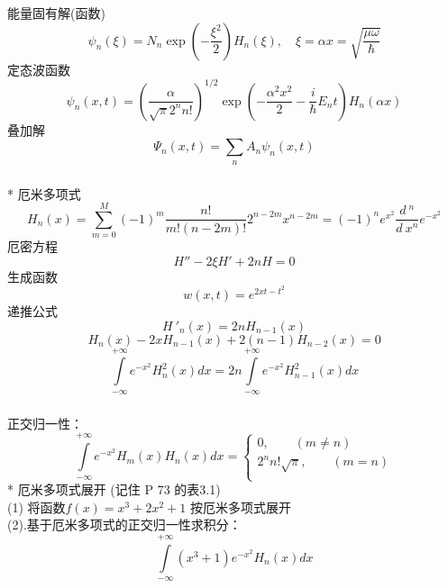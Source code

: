 \begin{frame}
      \frametitle{}
    能量固有解(函数)
	\begin{equation*}
		\psi_n(\xi) = N_n \exp(-\frac{\xi ^2}{2}) H_n(\xi) , \quad  \xi= \alpha x = \sqrt{\frac{\mu\omega}{\hbar}}
	\end{equation*}  
    定态波函数
	\begin{equation*}
		\psi_n(x,t) = \left( \frac{\alpha}{\sqrt{\pi} 2^n n!}  \right) ^{1/2}  \exp(-\frac{ \alpha^2 x^2}{2} -\frac{i}{\hbar} E_n t ) H_n(\alpha x) 
	\end{equation*}  
    叠加解
	\begin{equation*}
		\Psi_n(x,t) = \sum_n A_n \psi_n(x,t) 
	\end{equation*}   
\end{frame}

\begin{frame}
      \frametitle{}
      * 厄米多项式
      \begin{equation*}
		H_n(x) =\sum_{m=0}^{M}  (-1)^m \frac{n! } {  m ! (n-2m)!}  2^{n-2m} x^{n-2m} = (-1) ^n e^{x^2}  \frac{d~^n }{d~x^n}  e^{-x^2}
	\end{equation*} 
	厄密方程
		\begin{equation*}
			H'' -2 \xi H' +2n H=0 
		\end{equation*}  
    生成函数 
		\begin{equation*}
			w(x,t)=e^{2xt-t^2}
		\end{equation*}
    递推公式
     \[H~'_n(x)=2nH_{n-1}(x)\]    
     \[H_{n}(x) -2xH_{n-1}(x) +2(n-1)H_{n-2} (x) =0\]  
     \[ \int\limits_{-\infty}^{+\infty} e^{-x^2} H^2 _n(x) dx =2n \int\limits_{-\infty}^{+\infty} e^{-x^{2}} H^2 _{n-1}(x) dx\]
\end{frame}

\begin{frame}
      \frametitle{}
      正交归一性：
      \begin{equation*}
        \int\limits_{-\infty}^{+\infty} e^{-x^{2}} H_m(x) H_n(x)dx =
          \begin{cases}
           0, \qquad (m \not =n) \\ 
           2^n n! \sqrt{\pi}, \qquad (m =n ) \\ 
          \end{cases} 
      \end{equation*}  
      * 厄米多项式展开 (记住 P 73 的表3.1) \\ \vspace*{0.6em}
      (1) 将函数$f(x)=x^3+2x^2 +1$ 按厄米多项式展开 \\
      (2).基于厄米多项式的正交归一性求积分：
	\[ \int\limits_{-\infty}^{+\infty} (x^3 +1)e^{-x^{2}} H_n(x) d x \]
\end{frame}

